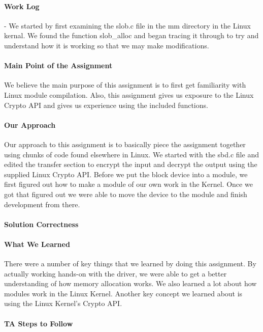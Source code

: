 \documentclass[titlepage,draftclsnofoot,onecolumn]{article}
\begin{document}
\paragraph{Work Log}
- We started by first examining the slob.c file in the mm directory in the Linux kernal. We found the function slob_alloc and began tracing it through to try and understand how it is working so that we may make modifications.

\paragraph{Main Point of the Assignment}
We believe the main purpose of this assignment is to first get familiarity with Linux module compilation. Also, this assignment gives us exposure to the Linux Crypto API and gives us experience using the included functions.

\paragraph{Our Approach}
Our approach to this assignment is to basically piece the assignment together using chunks of code found elsewhere in Linux. We started with the sbd.c file and edited the transfer section to encrypt the input and decrypt the output using the supplied Linux Crypto API. Before we put the block device into a module, we first figured out how to make a module of our own work in the Kernel. Once we got that figured out we were able to move the device to the module and finish development from there.

\paragraph{Solution Correctness}


\paragraph{What We Learned}
There were a number of key things that we learned by doing this assignment. By actually working hands-on with the driver, we were able to get a better understanding of how memory allocation works. We also learned a lot about how modules work in the Linux Kernel. Another key concept we learned about is using the Linux Kernel's Crypto API.

\paragraph{TA Steps to Follow}
\end{document}
